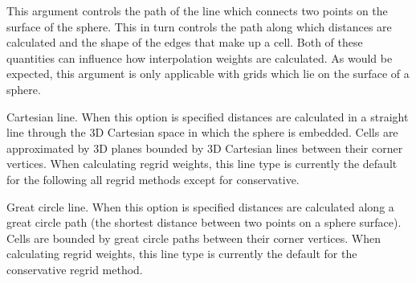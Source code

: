 \documentclass[letterpaper,10pt,english]{sphinxmanual}
\begin{document}
\begin{fulllineitems}
\label{\detokenize{LineType:ESMF.api.constants.LineType}}
This argument controls the path of the line which connects two points on
the surface of the sphere. This in turn controls the path along which
distances are calculated and the shape of the edges that make up a cell.
Both of these quantities can influence how interpolation weights are
calculated. As would be expected, this argument is only applicable with
grids which lie on the surface of a sphere.

\begin{fulllineitems}
\label{\detokenize{LineType:ESMF.api.constants.LineType.CART}}
Cartesian line. When this option is specified distances are calculated in a
straight line through the 3D Cartesian space in which the sphere is
embedded. Cells are approximated by 3D planes bounded by 3D Cartesian lines
between their corner vertices. When calculating regrid weights, this line
type is currently the default for the following all regrid methods except
for conservative.

\end{fulllineitems}


\begin{fulllineitems}
\label{\detokenize{LineType:ESMF.api.constants.LineType.GREAT_CIRCLE}}
Great circle line. When this option is specified distances are calculated
along a great circle path (the shortest distance between two points on a
sphere surface). Cells are bounded by great circle paths between their
corner vertices. When calculating regrid weights, this line type is
currently the default for the conservative regrid method.

\end{fulllineitems}


\end{fulllineitems}
\end{document}
